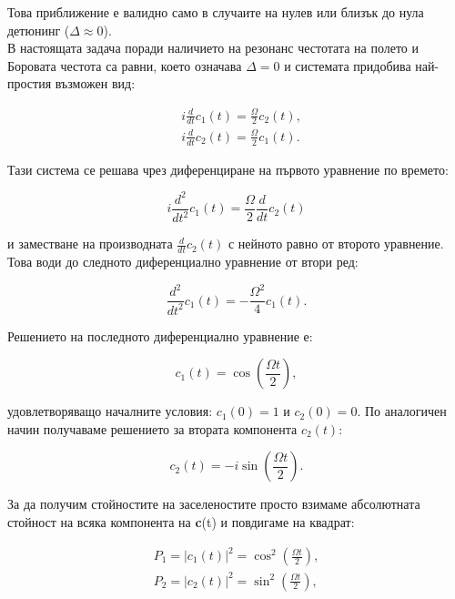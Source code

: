     Това приближение е валидно само в случаите на нулев или близък до нула детюнинг ($\Delta \approx 0$).\\
    В настоящата задача поради наличието на резонанс честотата на полето и Боровата честота са равни, което означава $\Delta = 0$ и системата придобива най-простия възможен вид:
    
    \begin{subequations}
        \begin{align}
            & \textit{i}\frac{d}{dt}c_1(t) = \frac{\Omega}{2}c_2(t),\\
            & \textit{i}\frac{d}{dt}c_2(t) = \frac{\Omega}{2}c_1(t).
        \end{align}
    \end{subequations}

    Тази система се решава чрез диференциране на първото уравнение по времето:
    
    \begin{equation}
        \textit{i}\frac{d^2}{dt^2}c_1(t) = \frac{\Omega}{2}\frac{d}{dt}c_2(t)
    \end{equation}

    и заместване на производната $\frac{d}{dt}c_2(t)$ с нейното равно от второто уравнение. Това води до следното диференциално уравнение от втори ред:
    
    \begin{equation}
        \frac{d^2}{dt^2}c_1(t) =-\frac{\Omega^2}{4}c_1(t).
    \end{equation}

    Решението на последното диференциално уравнение е:
    
    \begin{equation}
        c_1(t) = \cos\left(\frac{\Omega t}{2}\right),
    \end{equation}

    удовлетворяващо началните условия: $c_1(0) = 1$ и $c_2(0) = 0$.
    По аналогичен начин получаваме решението за втората компонента $c_2(t)$:

    \begin{equation}
        c_2(t) = -\textit{i}\sin\left(\frac{\Omega t}{2}\right).
    \end{equation}

    За да получим стойностите на заселеностите просто взимаме абсолютната стойност на всяка компонента на \textbf{c}(t) и повдигаме на квадрат:
    
    \begin{subequations} \label{2.12}
        \begin{align}
            P_1 = |c_1(t)|^2 = \cos^2\left(\frac{\Omega t}{2}\right),\\
            P_2 = |c_2(t)|^2 = \sin^2\left(\frac{\Omega t}{2}\right),
        \end{align}
    \end{subequations}

